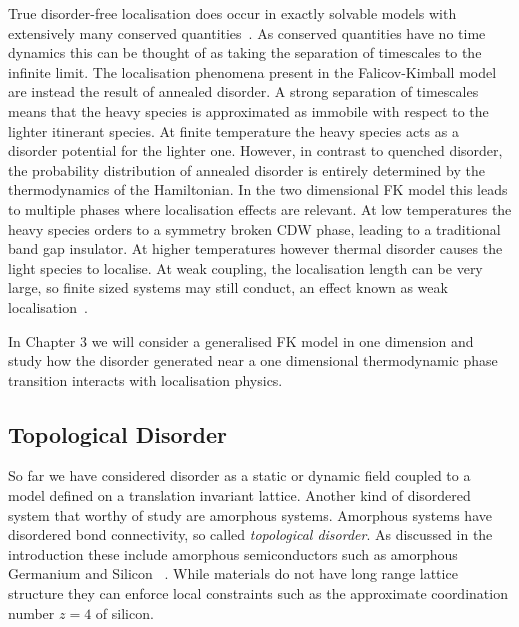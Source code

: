 True disorder-free localisation does occur in exactly solvable models with extensively many conserved quantities~\autocite{smithDisorderFreeLocalization2017}. As conserved quantities have no time dynamics this can be thought of as taking the separation of timescales to the infinite limit. The localisation phenomena present in the Falicov-Kimball model are instead the result of annealed disorder. A strong separation of timescales means that the heavy species is approximated as immobile with respect to the lighter itinerant species. At finite temperature the heavy species acts as a disorder potential for the lighter one. However, in contrast to quenched disorder, the probability distribution of annealed disorder is entirely determined by the thermodynamics of the Hamiltonian. In the two dimensional FK model this leads to multiple phases where localisation effects are relevant. At low temperatures the heavy species orders to a symmetry broken CDW phase, leading to a traditional band gap insulator. At higher temperatures however thermal disorder causes the light species to localise. At weak coupling, the localisation length can be very large, so finite sized systems may still conduct, an effect known as weak localisation~\autocite{antipovInteractionTunedAndersonMott2016}.

In Chapter 3 we will consider a generalised FK model in one dimension and study how the disorder generated near a one dimensional thermodynamic phase transition interacts with localisation physics.

\hypertarget{topological-disorder}{%
\subsection{Topological Disorder}\label{topological-disorder}}

So far we have considered disorder as a static or dynamic field coupled to a model defined on a translation invariant lattice. Another kind of disordered system that worthy of study are amorphous systems. Amorphous systems have disordered bond connectivity, so called \emph{topological disorder}. As discussed in the introduction these include amorphous semiconductors such as amorphous Germanium and Silicon ~\autocite{Yonezawa1983,zallen2008physics,Weaire1971,betteridge1973possible}. While materials do not have long range lattice structure they can enforce local constraints such as the approximate coordination number \(z = 4\) of silicon.

